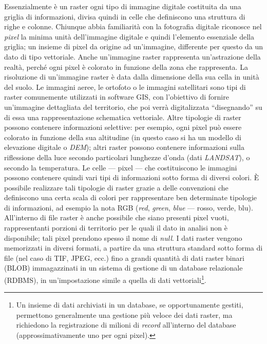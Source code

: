 	Essenzialmente è un raster ogni tipo di immagine digitale costituita da una griglia di informazioni, divisa quindi in celle che definiscono una struttura di righe e colonne. Chiunque abbia familiarità con la fotografia digitale riconosce nel \emph{pixel} la minima unità dell'immagine digitale e quindi l'elemento essenziale della griglia; un insieme di pixel da origine ad un'immagine, differente per questo da un dato di tipo vettoriale. Anche un'immagine raster rappresenta un'astrazione della realtà, perché ogni pixel è colorato in funzione della zona che rappresenta. La risoluzione di un'immagine raster è data dalla dimensione della sua cella in unità del suolo. Le immagini aeree, le ortofoto o le immagini satellitari sono tipi di raster comunemente utilizzati in software GIS, con l'obiettivo di fornire un'immagine dettagliata del territorio, che poi verrà digitalizzata ``disegnando'' su di essa una rappresentazione schematica vettoriale.  Altre tipologie di raster possono contenere informazioni selettive: per esempio, ogni pixel può essere colorato in funzione della sua altitudine (in questo caso si ha un modello di elevazione digitale o \emph{DEM}); altri raster possono contenere informazioni sulla riflessione della luce secondo particolari lunghezze d'onda (dati \emph{LANDSAT}), o secondo la temperatura. Le celle --- pixel --- che costituiscono le immagini possono contenere quindi vari tipi di informazioni sotto forma di diversi colori. È possibile realizzare tali tipologie di raster grazie a delle convenzioni che definiscono una certa scala di colori per rappresentare ben determinate tipologie di informazioni, ad esempio la nota RGB (\emph{red}, \emph{green}, \emph{blue} --- rosso, verde, blu). All'interno di file raster è anche possibile che siano presenti pixel vuoti, rappresentanti porzioni di territorio per le quali il dato in analisi non è disponibile; tali pixel prendono spesso il nome di \emph{null}. I dati raster vengono memorizzati in diversi formati, a partire da una struttura standard sotto forma di file (nel caso di TIF, JPEG, ecc.) fino a grandi quantità di dati raster binari (BLOB) immagazzinati in un sistema di gestione di un database relazionale (RDBMS), in un'impostazione simile a quella di dati vettoriali\footnote{Un insieme di dati archiviati in un database, se opportunamente gestiti, permettono generalmente una gestione più veloce dei dati raster, ma richiedono la registrazione di milioni di \emph{record} all'interno del database (approssimativamente uno per ogni pixel).}.
